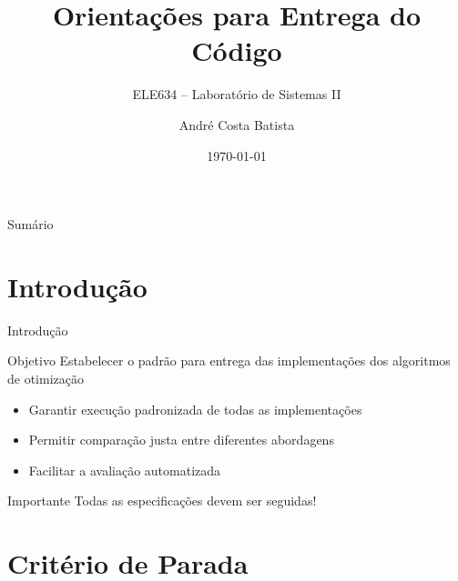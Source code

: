\documentclass[10pt]{beamer}
\title{Orientações para Entrega do Código}
\subtitle{ELE634 -- Laboratório de Sistemas II}
\author[André Batista]{André Costa Batista}
\institute[DEE/UFMG]{Universidade Federal de Minas Gerais}
\date{\today}
\begin{document}
\frame{\titlepage}

\begin{frame}{Sumário}
    \tableofcontents
\end{frame}

\section{Introdução}

\begin{frame}{Introdução}
    \begin{block}{Objetivo}
        Estabelecer o padrão para entrega das implementações dos algoritmos de otimização
    \end{block}
    
    \vspace{0.5cm}
    
    \begin{itemize}
        \item Garantir execução padronizada de todas as implementações
        \item Permitir comparação justa entre diferentes abordagens
        \item Facilitar a avaliação automatizada
    \end{itemize}
    
    \vspace{0.5cm}
    
    \begin{alertblock}{Importante}
        Todas as especificações devem ser seguidas!
    \end{alertblock}
\end{frame}

\section{Critério de Parada}
\end{document}
